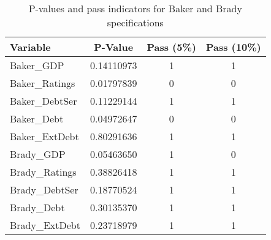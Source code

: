 \begin{table}[ht!]
\centering
\begin{tabular}{lccc}
\toprule
Variable               & P-Value    & Pass (5\%) & Pass (10\%) \\
\midrule
Baker\_GDP         & 0.14110973 & 1          & 1           \\
Baker\_Ratings          & 0.01797839 & 0          & 0           \\
Baker\_DebtSer           & 0.11229144 & 1          & 1           \\
Baker\_Debt           & 0.04972647 & 0          & 0           \\
Baker\_ExtDebt           & 0.80291636 & 1          & 1           \\
\midrule
Brady\_GDP         & 0.05463650 & 1          & 0           \\
Brady\_Ratings           & 0.38826418 & 1          & 1           \\
Brady\_DebtSer           & 0.18770524 & 1          & 1           \\
Brady\_Debt            & 0.30135370 & 1          & 1           \\
Brady\_ExtDebt            & 0.23718979 & 1          & 1           \\
\bottomrule
\end{tabular}
\caption{P-values and pass indicators for Baker and Brady specifications}
\label{tab:baker_brady_tests}
\end{table}
